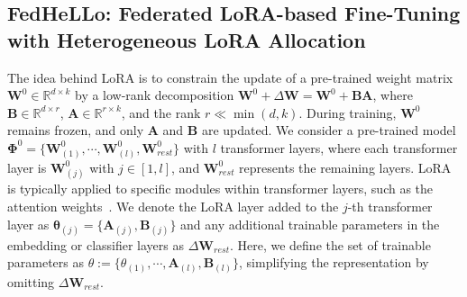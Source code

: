 \documentclass[lettersize,journal]{IEEEtran}
\begin{document}
\subsection{FedHeLLo: Federated LoRA-based Fine-Tuning with Heterogeneous LoRA Allocation}\label{sec:problem-formulation} 
The idea behind LoRA is to constrain the update of a pre-trained weight matrix $\boldsymbol{W}^0 \in \mathbb{R}^{d \times k}$ by a low-rank decomposition $\boldsymbol{W}^0 + \Delta \boldsymbol{W} = \boldsymbol{W}^0 + \boldsymbol{B} \boldsymbol{A}$, where $\boldsymbol{B} \in \mathbb{R}^{d \times r}$, $\boldsymbol{A} \in \mathbb{R}^{r \times k}$, and the rank $r \ll \min(d, k)$. During training, $\boldsymbol{W}^0$ remains frozen, and only $\boldsymbol{A}$ and $\boldsymbol{B}$ are updated. We consider a pre-trained model $\boldsymbol{\Phi}^0 = \{\boldsymbol{W}_{(1)}^0, \cdots, \boldsymbol{W}_{(l)}^0, \boldsymbol{W}_{rest}^0\}$ with $l$ transformer layers, where each transformer layer is $\boldsymbol{W}_{(j)}^0$ with $j \in [1, l]$, and $\boldsymbol{W}_{rest}^0$ represents the remaining layers. LoRA is typically applied to specific modules within transformer layers, such as the attention weights~\cite{hu2021lora}. 
{We denote the LoRA layer added to the $j$-th transformer layer as 
$\boldsymbol{\theta}_{(j)} = \{\boldsymbol{A}_{(j)}, \boldsymbol{B}_{(j)}\}$
and any additional trainable parameters in the embedding or classifier layers as $\Delta\boldsymbol{W}_{rest}$.} 
Here, we define the set of trainable parameters as { \(\boldsymbol{\mathcal{\theta}}:= \{\boldsymbol{\mathcal{\theta}}_{(1)}, \cdots, \boldsymbol{A}_{(l)}, \boldsymbol{B}_{(l)}\}\), simplifying the representation by omitting \(\Delta\boldsymbol{W}_{rest}\).}
\end{document}
